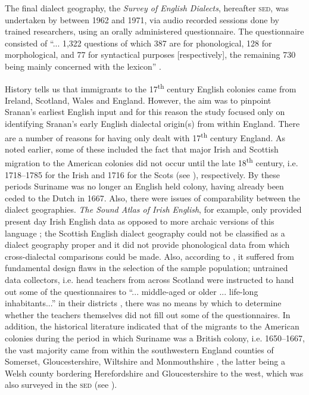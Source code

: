 The final dialect geography, the \emph{Survey of English Dialects}, hereafter \textsc{sed}, was undertaken by \citet{Orton6271} between 1962 and 1971, via audio recorded sessions done by trained researchers, using an orally administered questionnaire. The questionnaire consisted of  ``... 1,322 questions of which 387 are for phonological, 128 for morphological, and 77 for syntactical purposes [respectively], the remaining 730 being mainly concerned with the lexicon'' \citep[15]{Orton62}.

History tells us that immigrants to the 17\textsuperscript{th} century English colonies came from Ireland, Scotland, Wales and England. However, the aim was to pinpoint Sranan's earliest English input and for this reason the study focused only on identifying Sranan's early English dialectal origin(s) from within England. There are a number of reasons for having only dealt with 17\textsuperscript{th} century England. As noted earlier, some of these included the fact that major Irish and Scottish migration to the American colonies did not occur until the late 18\textsuperscript{th} century, i.e. 1718--1785 for the Irish \citep{Griffin01} and 1716 for the Scots (see \citealt{Dobson05}), respectively. By these periods Suriname was no longer an English held colony, having already been ceded to the Dutch in 1667. Also, there were issues of comparability between the dialect geographies. \emph{The Sound Atlas of Irish English}, for example, only provided present day Irish English data as opposed to more archaic versions of this language \citep{Hickey04}; the Scottish English dialect geography could not be classified as a dialect geography proper and it did not provide phonological data from which cross-dialectal comparisons could be made. Also, according to  \citet{Macaulay77}, it suffered from fundamental design flaws in the selection of the sample population; untrained data collectors, i.e. head teachers from across Scotland were instructed to hand out some of the questionnaires to ``... middle-aged or older ... life-long inhabitants...'' in their districts \citep[14]{Macaulay77}, there was no means by which to determine whether the teachers themselves did not fill out some of the questionnaires. In addition, the historical literature indicated that of the migrants to the American colonies during the period in which Suriname was a British colony, i.e. 1650--1667, the vast majority came from within the southwestern England counties of Somerset, Gloucestershire, Wiltshire and Monmouthshire \citep{Burg95, Schaefer98}, the latter being a Welsh county bordering Herefordshire and Gloucestershire to the west, which was also surveyed in the \textsc{sed} (see ).

